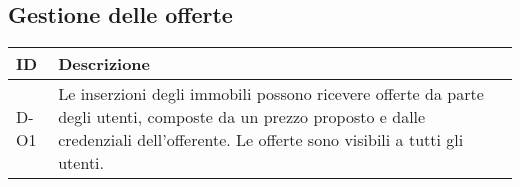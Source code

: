 \subsection*{Gestione delle offerte}

\begin{table}[H]
    \centering
    \renewcommand{\arraystretch}{1.3} %
    
    \begin{tabular}{|p{3cm}|p{10cm}|} 
        \hline
        \textbf{ID} & \textbf{Descrizione} \\  
        \hline
        D-O1 & Le inserzioni degli immobili possono ricevere offerte da parte degli utenti, composte da un prezzo proposto e dalle credenziali dell’offerente. Le offerte sono visibili a tutti gli utenti. \\ 
        \hline
    \end{tabular}
    
\end{table}